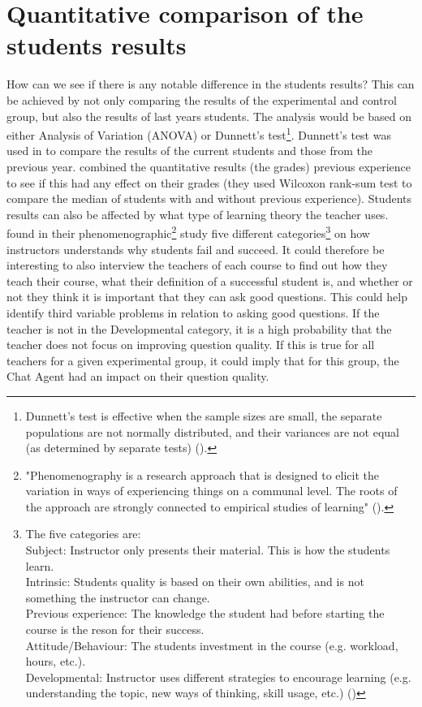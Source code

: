 \section{Quantitative comparison of the students results}
\label{chapter4:quantitative_comparison}
How can we see if there is any notable difference in the students results? This can be achieved by not only comparing the results of the experimental and control group, but 
also the results of last years students. The analysis would be based on either Analysis of Variation (ANOVA) or Dunnett's test\footnote{Dunnett's test is effective 
	when the sample sizes are small, the separate populations are not normally distributed, and their variances are not equal (as determined by separate tests) 
	(\citet[p.~3]{Simon2011}).}. Dunnett's test was used in \citet{Simon2011} to compare the results of the current students and those from the previous year. 
\citet{Tafliovich2013} combined the quantitative results (the grades) previous experience to see if this had any effect on their grades (they used Wilcoxon rank-sum test 
to compare the median of students with and without previous experience).
\vspace{0.5em}\newline
Students results can also be affected by what type of learning theory the teacher uses. \citet{Kinnunen2007} found in their phenomenographic\footnote{"Phenomenography is a 
	research approach that is designed 	to elicit the variation in ways of experiencing things on a communal level. The roots of the approach are strongly
	connected to empirical studies of learning" (\citet[p.~3]{Kinnunen2007}).} study five different categories\footnote{The five categories are: \\
	Subject: Instructor only presents their material. This is how the students learn. \\
	Intrinsic: Students quality is based on their own abilities, and is not something the instructor can change. \\
	Previous experience: The knowledge the student had before starting the course is the reson for their success. \\
	Attitude/Behaviour: The students investment in the course (e.g. workload, hours, etc.).  \\
	Developmental: Instructor uses different strategies to encourage learning (e.g. understanding the topic, new ways of thinking, skill usage, etc.)
	(\citet[p.~5-7]{Kinnunen2007})
	} on how instructors understands why students fail and succeed. 
It could therefore be interesting to also interview the teachers of each course to find out how they teach their course, what their definition of a successful student is, 
and whether or not they think it is important that they can ask good questions. This could help identify third variable problems in relation to asking good questions. If 
the teacher is not in the Developmental category, it is a high probability that the teacher does not focus on improving question quality. If this is true for all teachers 
for a given experimental group, it could imply that for this group, the Chat Agent had an impact on their question quality.

